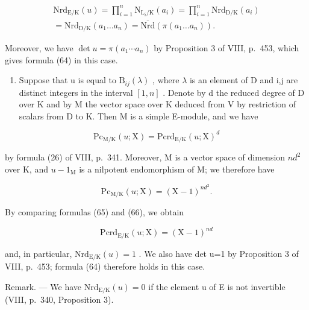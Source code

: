 \[
\begin{array}{c} \mathrm{Nrd} _ {\mathrm{E/K}} (u) = \prod_ {i = 1} ^ {n} \mathrm{N} _ {\mathrm{L} _ {i} / \mathrm{K}} (a _ {i}) = \prod_ {i = 1} ^ {n} \mathrm{Nrd} _ {\mathrm{D/K}} (a _ {i}) \\ = \mathrm{Nrd} _ {\mathrm{D/K}} (a _ {1} \dots a _ {n}) = \overline {{\mathrm{Nrd}}} (\pi (a _ {1} \dots a _ {n}))  . \end{array}
\]

Moreover, we have \(\det u = \pi(a_{1} \cdots a_{n})\) by Proposition 3 of VIII, p.~453, which gives formula (64) in this case.

\begin{enumerate}
\def\labelenumi{\Alph{enumi})}
\setcounter{enumi}{1}
\tightlist
\item
  Suppose that u is equal to \(\mathrm{B}_{ij}(\lambda)\) , where \(\lambda\) is an element of D and i,j are distinct integers in the interval \([1,n]\) . Denote by d the reduced degree of D over K and by M the vector space over K deduced from V by restriction of scalars from D to K. Then M is a simple E-module, and we have
\end{enumerate}

\[
\mathrm{Pc} _ {\mathrm{M/K}} (u; \mathrm{X}) = \mathrm{Pcrd} _ {\mathrm{E/K}} (u; \mathrm{X}) ^ {d}\tag{65}
\]

by formula (26) of VIII, p.~341. Moreover, M is a vector space of dimension \(nd^2\) over K, and \(u - 1_{\mathrm{M}}\) is a nilpotent endomorphism of M; we therefore have

\[
\mathrm{Pc} _ {\mathrm{M/K}} (u; \mathrm{X}) = (\mathrm{X} - 1) ^ {n d ^ {2}}.\tag{66}
\]

By comparing formulas (65) and (66), we obtain

\[
\mathrm{Pcrd} _ {\mathrm{E/K}} (u; \mathrm{X}) = (\mathrm{X} - 1) ^ {n d}\tag{67}
\]

and, in particular, \(\mathrm{Nrd}_{\mathrm{E}/\mathrm{K}}(u)=1\) . We also have det u=1 by Proposition 3 of VIII, p.~453; formula (64) therefore holds in this case.

Remark. --- We have \(\mathrm{Nrd}_{\mathrm{E}/\mathrm{K}}(u)=0\) if the element u of E is not invertible (VIII, p.~340, Proposition 3).

